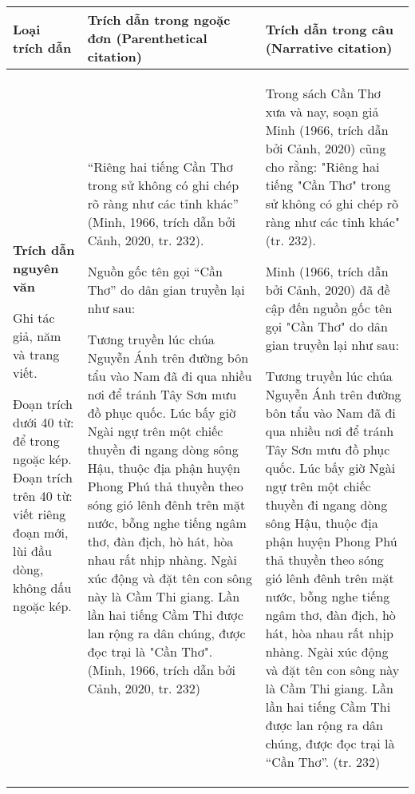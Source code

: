  \begin{table*}
\centering
\begin{tabular}{|l|l|l|}
    \hline
      Loại trích dẫn   & Trích dẫn trong ngoặc đơn (Parenthetical citation) & Trích dẫn trong câu 
(Narrative citation)
\\
     \hline       
     \textbf{Trích dẫn nguyên văn}
     
Ghi tác giả, năm và trang viết.


Đoạn trích dưới 40 từ: để trong ngoặc kép.
Đoạn trích trên 40 từ: viết riêng đoạn mới, lùi đầu dòng, không dấu ngoặc kép.
    & ``Riêng hai tiếng Cần Thơ trong sử không có ghi chép rõ ràng như các tỉnh khác'' (Minh, 1966, trích dẫn bởi Cảnh, 2020, tr. 232). 


Nguồn gốc tên gọi ``Cần Thơ'' do dân gian truyền lại như sau:

Tương truyền lúc chúa Nguyễn Ánh trên đường bôn tẩu vào Nam đã đi qua nhiều nơi để tránh Tây Sơn mưu đồ phục quốc. Lúc bấy giờ Ngài ngự trên một chiếc thuyền đi ngang dòng sông Hậu, thuộc địa phận huyện Phong Phú thả thuyền theo sóng gió lênh đênh trên mặt nước, bỗng nghe tiếng ngâm thơ, đàn địch, hò hát, hòa nhau rất nhịp nhàng. Ngài xúc động và đặt tên con sông này là Cầm Thi giang. Lần lần hai tiếng Cầm Thi được lan rộng ra dân chúng, được đọc trại là "Cần Thơ". (Minh, 1966, trích dẫn bởi Cảnh, 2020, tr. 232)
 & Trong sách Cần Thơ xưa và nay, soạn giả Minh (1966, trích dẫn bởi Cảnh, 2020) cũng cho rằng: "Riêng hai tiếng "Cần Thơ" trong sử không có ghi chép rõ ràng như các tỉnh khác" (tr. 232). 

Minh (1966, trích dẫn bởi Cảnh, 2020) đã đề cập đến nguồn gốc tên gọi "Cần Thơ" do dân gian truyền lại như sau:

Tương truyền lúc chúa Nguyễn Ánh trên đường bôn tẩu vào Nam đã đi qua nhiều nơi để tránh Tây Sơn mưu đồ phục quốc. Lúc bấy giờ Ngài ngự trên một chiếc thuyền đi ngang dòng sông Hậu, thuộc địa phận huyện Phong Phú thả thuyền theo sóng gió lênh đênh trên mặt nước, bỗng nghe tiếng ngâm thơ, đàn địch, hò hát, hòa nhau rất nhịp nhàng. Ngài xúc động và đặt tên con sông này là Cầm Thi giang. Lần lần hai tiếng Cầm Thi được lan rộng ra dân chúng, được đọc trại là ``Cần Thơ''. (tr. 232)
\\
         \hline
    \end{tabular}
\end{table*}